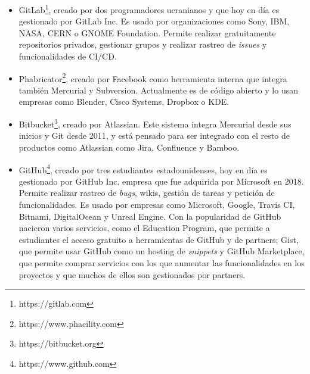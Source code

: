 \begin{itemize}
	\item GitLab\footnote{https://gitlab.com}, creado por dos programadores ucranianos y que hoy en día es gestionado por GitLab Inc. Es usado por organizaciones como Sony, IBM, NASA, CERN o GNOME Foundation. Permite realizar gratuitamente repositorios privados, gestionar grupos y realizar rastreo de \textit{issues} y funcionalidades de CI/CD.
	\item Phabricator\footnote{https://www.phacility.com}, creado por Facebook como herramienta interna que integra también Mercurial y Subversion. Actualmente es de código abierto y lo usan empresas como Blender, Cisco Systems, Dropbox o KDE.
	\item Bitbucket\footnote{https://bitbucket.org}, creado por Atlassian. Este sistema integra Mercurial desde sus inicios y Git desde 2011, y está pensado para ser integrado con el resto de productos como Atlassian como Jira, Confluence y Bamboo.
	\item GitHub\footnote{https://www.github.com}, creado por tres estudiantes estadounidenses, hoy en día es gestionado por GitHub Inc. empresa que fue adquirida por Microsoft en 2018. Permite realizar rastreo de \textit{bugs}, wikis, gestión de tareas y petición de funcionalidades. Es usado por empresas como Microsoft, Google, Travis CI, Bitnami, DigitalOcean y Unreal Engine. Con la popularidad de GitHub nacieron varios servicios, como el Education Program, que permite a estudiantes el acceso gratuito a herramientas de GitHub y de partners; Gist, que permite usar GitHub como un hosting de \textit{snippets} y GitHub Marketplace, que permite comprar servicios con los que aumentar las funcionalidades en los proyectos y que muchos de ellos son gestionados por partners.
\end{itemize}